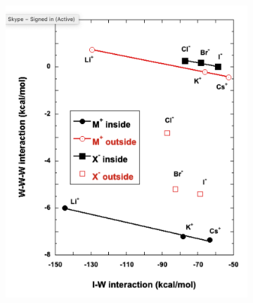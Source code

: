 \documentclass[11pt, proquest]{uwthesis}[2020/02/24]
\begin{document}
\begin{figure}
\begin{subfigure}[t]{.5\textwidth}
    \includegraphics[width=.9\linewidth]{Figures/Chapter_3/figure_9_tr.pdf}
  \end{subfigure}

  \medskip


\end{figure}
\end{document}
